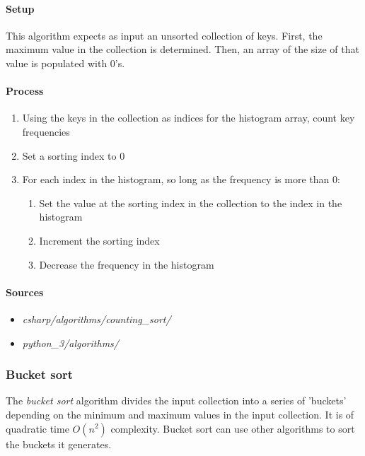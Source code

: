 \documentclass{article}
\begin{document}
\paragraph{Setup}
This algorithm expects as input an unsorted collection of keys. First, the maximum value in the collection is
determined. Then, an array of the size of that value is populated with 0's.

\paragraph{Process}
\begin{enumerate}
\item{Using the keys in the collection as indices for the histogram array, count key frequencies}
\item{Set a sorting index to 0}
\item{For each index in the histogram, so long as the frequency is more than 0:}
  \begin{enumerate}
  \item{Set the value at the sorting index in the collection to the index in the histogram}
  \item{Increment the sorting index}
  \item{Decrease the frequency in the histogram}
  \end{enumerate}
\end{enumerate}

\begin{samepage}
  \paragraph{Sources}
  \begin{itemize}
  \item{{\em csharp/algorithms/counting\_sort/}}
  \item{{\em python\_3/algorithms/}}
  \end{itemize}
\end{samepage}


\subsubsection{Bucket sort}
The {\em bucket sort} algorithm divides the input collection into a series of 'buckets' depending on the minimum and
maximum values in the input collection. It is of quadratic time \(O(n^2)\) complexity. Bucket sort can use other
algorithms to sort the buckets it generates.
\end{document}
